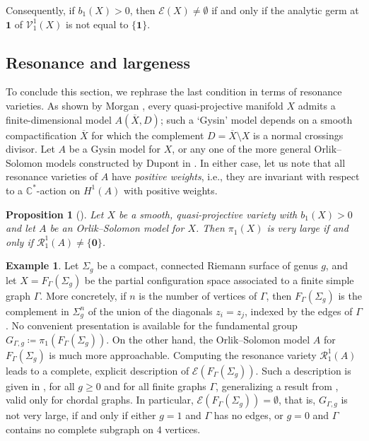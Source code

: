 \documentclass{article}
\numberwithin{equation}{section}
\newtheorem{proposition}[theorem]{Proposition}
\theoremstyle{definition}
\newtheorem{example}[theorem]{Example}
\renewcommand{\C}{\mathbb{C}}
\newcommand{\VV}{\mathcal{V}}
\newcommand{\RR}{\mathcal{R}}
\newcommand{\oX}{\overline{X}}
\newcommand{\one}{\mathbf{1}}
\newcommand{\zero}{\mathbf{0}}
\begin{document}
Consequently, if $b_1(X)>0$, 
then $\mathcal{E}(X)\ne \emptyset$ if and only if the analytic germ 
at $\one$ of $\VV^1_1(X)$ is not equal to $\{ \one\}$. 

\subsection{Resonance and largeness}
\label{subsec:reslarge}
To conclude this section, we rephrase the last condition in terms of resonance varieties.
As shown by Morgan \cite{Mo}, every quasi-projective manifold $X$ 
admits a finite-dimensional model $A(\oX,D)$; such a `Gysin' model depends on 
a smooth compactification $\oX$ for which the complement 
$D=\oX\setminus X$ is a normal crossings divisor.  
Let $A$ be a Gysin model for $X$, or any one of the more general Orlik--Solomon 
models constructed by Dupont in \cite{Dp16}. In either case, let us note that all 
resonance varieties of $A$ have {\em positive weights}, i.e., they are invariant 
with respect to a $\C^{*}$-action on $H^1(A)$ with positive weights.

\begin{proposition}[\cite{PS-jlms}]
\label{prop:qprojtest}
Let $X$ be a smooth, quasi-projective variety with $b_1(X)>0$ and let $A$ be an 
Orlik--Solomon model for $X$.  Then  $\pi_1(X)$ is very large if and only if 
$\RR^1_1(A)\ne \{ \zero\}$.
\end{proposition}

\begin{example}
\label{ex:partial}
Let $\Sigma_g$ be a compact, connected Riemann surface 
of genus $g$, and let $X=F_{\Gamma}(\Sigma_g)$ be the partial 
configuration space associated to a finite simple graph $\Gamma$.  
More concretely, if $n$ is the number of vertices of $\Gamma$, then 
$F_{\Gamma}(\Sigma_g)$ is the complement in 
$\Sigma_g^n$ of the union of the diagonals $z_i=z_j$, indexed by 
the edges of $\Gamma$. 
No convenient presentation is available for the fundamental group 
$G_{\Gamma, g}\coloneqq \pi_1(F_{\Gamma}(\Sigma_g))$.  
On the other hand, the Orlik--Solomon model $A$ for 
$F_{\Gamma}(\Sigma_g)$ is much more approachable. Computing the resonance 
variety $\RR^1_1(A)$ leads to a complete, explicit description of 
$\mathcal{E}(F_{\Gamma}(\Sigma_g))$. Such a description is given in 
\cite{BMPP}, for all $g\ge 0$ and for all finite graphs $\Gamma$,  
generalizing a result from \cite{BH}, valid only for chordal graphs. 
In particular, $\mathcal{E}(F_{\Gamma}(\Sigma_g))= \emptyset$, that is, 
$G_{\Gamma,g}$ is not very large, if and only if 
either $g=1$ and $\Gamma$ has no edges, or $g=0$ 
and  $\Gamma$ contains no complete subgraph on $4$ vertices. 
\end{example}
\end{document}
